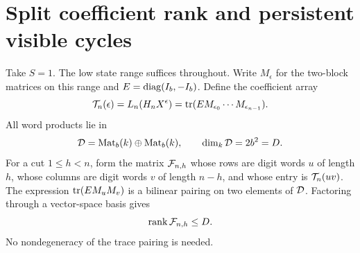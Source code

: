 \section{Split coefficient rank and persistent visible cycles}\label{sec:rank}

Take $S=1$. The low state range suffices throughout. Write
$M_\epsilon$ for the two-block matrices on this range and
$E=\operatorname{diag}(I_b,-I_b)$. Define the coefficient array
\begin{equation}\label{eq:tensor}
 \mathcal T_n(\epsilon)=L_n(H_nX^\epsilon)
   =\operatorname{tr}(E M_{\epsilon_0}\cdots M_{\epsilon_{n-1}}).
\end{equation}
All word products lie in
\begin{equation}\label{eq:blockalgebra}
 \mathcal D=\operatorname{Mat}_b(k)\oplus\operatorname{Mat}_b(k),\qquad \dim_k\mathcal D=2b^2=D.
\end{equation}
For a cut $1\le h<n$, form the matrix $\mathcal F_{n,h}$ whose rows
are digit words $u$ of length $h$, whose columns are digit words
$v$ of length $n-h$, and whose entry is $\mathcal T_n(uv)$.
The expression $\operatorname{tr}(E M_uM_v)$ is a bilinear pairing on two
elements of $\mathcal D$. Factoring through a vector-space basis gives
\begin{equation}\label{eq:rankupper}
 \operatorname{rank}\mathcal F_{n,h}\le D.
\end{equation}
No nondegeneracy of the trace pairing is needed.


